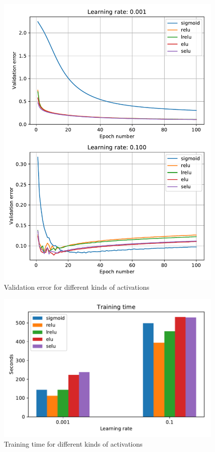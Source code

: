 \documentclass{article}
\begin{document}
\begin{figure}[tb]
\vskip 5mm
\begin{center}
\centerline{\includegraphics[width=\columnwidth]{activations_val_error}}
\caption{Validation error for different kinds of activations}
\label{fig:sample-graph}
\end{center}
\vskip -5mm
\end{figure} 

\begin{figure}[tb]
\vskip 5mm
\begin{center}
\centerline{\includegraphics[width=\columnwidth]{activations_training_time}}
\caption{Training time for different kinds of activations}
\label{fig:sample-graph}
\end{center}
\vskip -5mm
\end{figure} 
\end{document}
